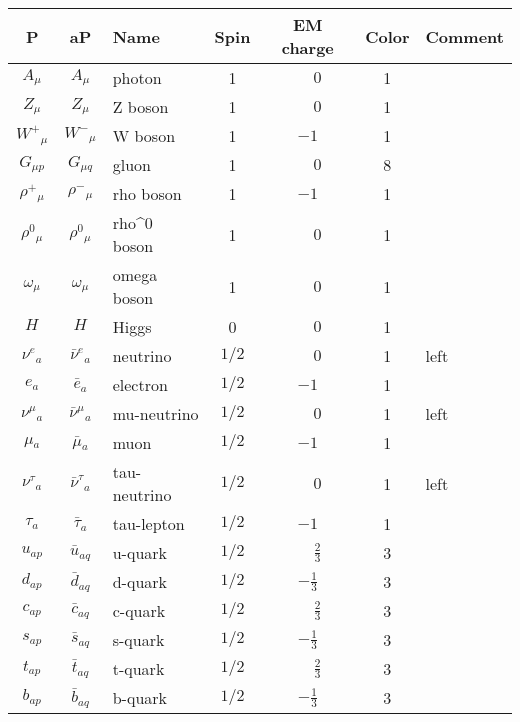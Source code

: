 \begin{tabular}{|cc|l|c|c|c|l|} \hline
P & aP & Name & Spin  & EM charge & Color & Comment \\ \hline
$A_{\mu }$&$A_{\mu }$&photon        &1           & $\phantom{-}0$ &1    &   \\
$Z_{\mu }$&$Z_{\mu }$&Z boson       &1           & $\phantom{-}0$ &1    &   \\
$W^+{}_{\mu }$&$W^-{}_{\mu }$&W boson       &1           &$-1$ &1    &   \\
$G_{\mu p}$&$G_{\mu q}$&gluon         &1           & $\phantom{-}0$ &8    &   \\
$\rho^+{}_{\mu }$&$\rho^-{}_{\mu }$&rho boson     &1           &$-1$ &1    &   \\
$\rho^0{}_{\mu }$&$\rho^0{}_{\mu }$&rho^0 boson   &1           & $\phantom{-}0$ &1    &   \\
$\omega{}_{\mu }$&$\omega{}_{\mu }$&omega boson   &1           & $\phantom{-}0$ &1    &   \\
$H_{}$    &$H_{}$    &Higgs         &0           & $\phantom{-}0$ &1    &   \\
$\nu^e{}_{a}$&$\bar{\nu}^e{}_{a}$&neutrino      &$1/2$       & $\phantom{-}0$ &1    &left\\
$e{}_{a}$ &$\bar{e}{}_{a}$&electron      &$1/2$       &$-1$ &1    &   \\
$\nu^\mu{}_{a}$&$\bar{\nu}^\mu{}_{a}$&mu-neutrino   &$1/2$       & $\phantom{-}0$ &1    &left\\
$\mu{}_{a}$&$\bar{\mu}{}_{a}$&muon          &$1/2$       &$-1$ &1    &   \\
$\nu^\tau{}_{a}$&$\bar{\nu}^\tau{}_{a}$&tau-neutrino  &$1/2$       & $\phantom{-}0$ &1    &left\\
$\tau{}_{a}$&$\bar{\tau}{}_{a}$&tau-lepton    &$1/2$       &$-1$ &1    &   \\
$u{}_{ap}$&$\bar{u}{}_{aq}$&u-quark       &$1/2$       &$\phantom{-}\frac{2}{3}$ &3    &   \\
$d{}_{ap}$&$\bar{d}{}_{aq}$&d-quark       &$1/2$       &$-\frac{1}{3}$ &3    &   \\
$c{}_{ap}$&$\bar{c}{}_{aq}$&c-quark       &$1/2$       &$\phantom{-}\frac{2}{3}$ &3    &   \\
$s{}_{ap}$&$\bar{s}{}_{aq}$&s-quark       &$1/2$       &$-\frac{1}{3}$ &3    &   \\
$t{}_{ap}$&$\bar{t}{}_{aq}$&t-quark       &$1/2$       &$\phantom{-}\frac{2}{3}$ &3    &   \\
$b{}_{ap}$&$\bar{b}{}_{aq}$&b-quark       &$1/2$       &$-\frac{1}{3}$ &3    &   \\ \hline
\end{tabular}
